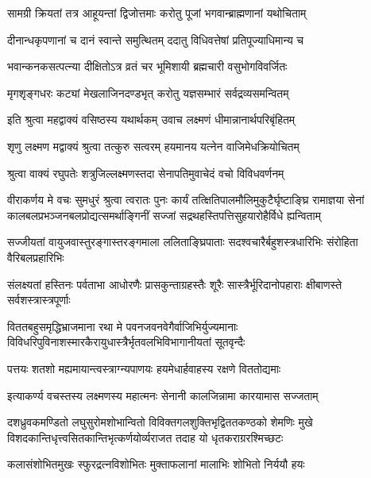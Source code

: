 \twolineshloka
{सामग्री क्रियतां तत्र आहूयन्तां द्विजोत्तमाः}
{करोतु पूजां भगवान्ब्राह्मणानां यथोचिताम्}%

\twolineshloka
{दीनान्धकृपणानां च दानं स्वान्ते समुत्थितम्}
{ददातु विधिवत्तेषां प्रतिपूज्याधिमान्य च}%

\twolineshloka
{भवान्कनकसत्पत्न्या दीक्षितोऽत्र व्रतं चर}
{भूमिशायी ब्रह्मचारी वसुभोगविवर्जितः}%

\twolineshloka
{मृगशृङ्गधरः कट्यां मेखलाजिनदण्डभृत्}
{करोतु यज्ञसम्भारं सर्वद्रव्यसमन्वितम्}%

\twolineshloka
{इति श्रुत्वा महद्वाक्यं वसिष्ठस्य यथार्थकम्}
{उवाच लक्ष्मणं धीमान्नानार्थपरिबृंहितम्}%


\twolineshloka
{शृणु लक्ष्मण मद्वाक्यं श्रुत्वा तत्कुरु सत्वरम्}
{हयमानय यत्नेन वाजिमेधक्रियोचितम्}%


\twolineshloka
{श्रुत्वा वाक्यं रघुपतेः शत्रुजिल्लक्ष्मणस्तदा}
{सेनापतिमुवाचेदं वचो विविधवर्णनम्}%


\fourlineindentedshloka
{वीराकर्णय मे वचः सुमधुरं श्रुत्वा त्वरातः पुनः}
{कार्यं तत्क्षितिपालमौलिमुकुटैर्घृष्टाङ्घ्रि रामाज्ञया}
{सेनां कालबलप्रभञ्जनबलप्रोद्यत्समर्थाङ्गिनीं}
{सज्जां सद्रथहस्तिपत्तिसुहयारोहैर्विधे ह्यन्विताम्}%

\twolineshloka
{सज्जीयतां वायुजवास्तुरङ्गास्तरङ्गमाला ललिताङ्घ्रिपाताः}
{सदश्वचारैर्बहुशस्त्रधारिभिः संरोहिता वैरिबलप्रहारिभिः}%

\twolineshloka
{संलक्ष्यतां हस्तिनः पर्वताभा आधोरणैः प्रासकुन्ताग्रहस्तैः}
{शूरैः सास्त्रैर्भूरिदानोपहाराः क्षीबाणस्ते सर्वशस्त्रास्त्रपूर्णाः}%

\twolineshloka
{विततबहुसमृद्धिभ्राजमाना रथा मे पवनजवनवेगैर्वाजिभिर्युज्यमानाः}
{विविधरिपुविनाशस्मारकैरायुधास्त्रैर्भृतवलभिविभागानीयतां सूतवृन्दैः}%

\twolineshloka
{पत्तयः शतशो मह्यमायान्त्वस्त्राग्न्यपाणयः}
{हयमेधार्हवाहस्य रक्षणे विततोद्यमाः}%

\twolineshloka
{इत्याकर्ण्य वचस्तस्य लक्ष्मणस्य महात्मनः}
{सेनानी कालजिन्नामा कारयामास सज्जताम्}%

\twolineshloka
{दशध्रुवकमण्डितो लघुसुरोमशोभान्वितो विविक्तगलशुक्तिभृद्विततकण्ठको शेमणिः मुखे}
{विशदकान्तिधृत्त्वसितकान्तिभृत्कर्णयोर्व्यराजत तदाह यो धृतकराग्ररश्मिच्छटः}%

\twolineshloka
{कलासंशोभितमुखः स्फुरद्रत्नविशोभितः}
{मुक्ताफलानां मालाभिः शोभितो निर्ययौ हयः}%

